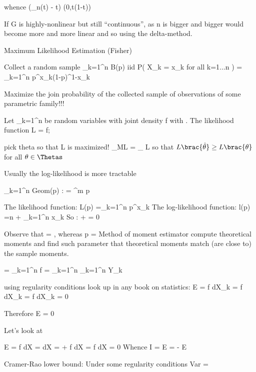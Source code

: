 {whence ({_n(t) - t})  (0,t(1-t))

If G is highly-nonlinear but still ``continuous'', as n is bigger and bigger would become more and more linear and so using the delta-method.

Maximum Likelihood Estimation (Fisher)

Collect a random sample _{k=1}^n \sym B(p) iid
P( X_k = x_k for all k=1...n ) = \prod_{k=1}^n p^{x_k}{(1-p)}^{1-x_k}

Maximize the join probability of the collected sample of observations of some parametric family!!!

Let _{k=1}^n be random variables with joint density f with \theta\in \Theta. The likelihood function L\brac{\theta} = f;\,\theta}

pick theta so that L is maximized! 
\hat{\theta}_{ML} = \argmax_{\theta \in \Theta} L\brac{\theta} so that $L\brac{\hat{\theta}}\geq L\brac{\theta}$ for all $\theta \in\Thetas$

Usually the log-likelihood is more tractable

_{k=1}^n \sym Geom(p) : \Pr{} = ^m p

The likelihood function: L(p) =\prod_{k=1}^n p^{x_k}
The log-likelihood function: l(p) =n  + \sum_{k=1}^n x_k
So  :  +  = 0

Observe that  = , whereas p = 
Method of moment estimator compute theoretical moments and find such parameter \theta that theoretical moments match (are close to) the sample moments. 

 =  \sum_{k=1}^n \log f = \sum_{k=1}^n  \sum_{k=1}^n Y_k

using regularity conditions look up in any book on statistics:
E = \int {}f dX_k = \int {} f dX_k =  \int f dX_k = 0

Therefore E = 0

Let's look at 

 E = \int {} f dX = \int {} dX = \int {}  + 
f  dX = \int {}f dX = 0
Whence I\brac{\theta} = E = - E 


Cramer-Rao lower bound: Under some regularity conditions
Var\brac{\hat{\theta}}\geq {} = 




